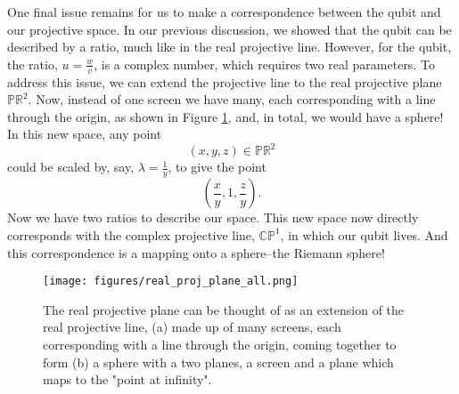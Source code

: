 \newpage

One final issue remains for us to make a correspondence between the qubit and our projective space. In our previous discussion, we showed that the qubit can be described by a ratio, much like in the real projective line. However, for the qubit, the ratio, $u = \frac{w}{v}$, is a complex number, which requires two real parameters. To address this issue, we can extend the projective line to the real projective plane $\mathbb{PR}^2$. Now, instead of one screen we have many, each corresponding with a line through the origin, as shown in Figure \ref{fig:real_projective_plane}, and, in total, we would have a sphere! \cite{penrose_road_2004} In this new space, any point 
$$ (x, y, z) \in \mathbb{PR}^2 $$
could be scaled by, say, $\lambda = \frac{1}{y}$, to give the point
$$ \left( \frac{x}{y}, 1, \frac{z}{y} \right).$$
Now we have two ratios to describe our space. This new space now directly corresponds with the complex projective line, $\mathbb{CP}^1$, in which our qubit lives. And this correspondence is a mapping onto a sphere--the Riemann sphere!

\begin{figure}[H]
    \centering
    \texttt{[image: figures/real\_proj\_plane\_all.png]}
    \caption{The real projective plane can be thought of as an extension of the real projective line, (a) made up of many screens, each corresponding with a line through the origin, coming together to form (b) a sphere with a two planes, a screen and a plane which maps to the "point at infinity".}
    \label{fig:real_projective_plane}
\end{figure}

\newpage